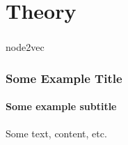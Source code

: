 \section[Theory]{Theory}

\begin{frame}
  \frametitle{}
  \begin{center}
    {\Huge node2vec}
  \end{center}
\end{frame}

\begin{frame}
    \frametitle{Some Example Title}
    \framesubtitle{Some example subtitle}
    \centering
    Some text, content, etc.
\end{frame}
